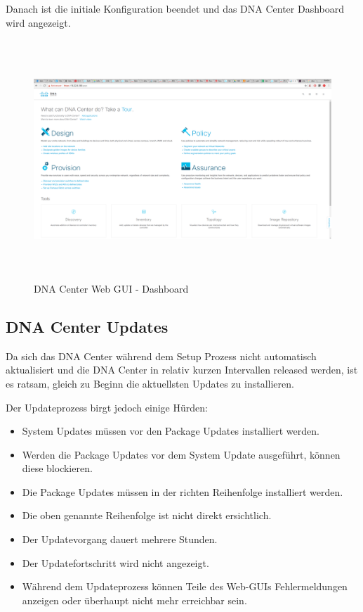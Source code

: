 Danach ist die initiale Konfiguration beendet und das DNA Center Dashboard wird angezeigt.

\begin{figure}[H]
	\centering
	\includegraphics[height=9cm]{img/sc_008.png}
	\caption{DNA Center Web GUI - Dashboard}
	\label{fig:dna-center-gui-4}
\end{figure}

\subsection{DNA Center Updates}
Da sich das DNA Center während dem Setup Prozess nicht automatisch aktualisiert und die DNA Center in relativ kurzen Intervallen released werden, ist es ratsam, gleich zu Beginn die aktuellsten Updates zu installieren.

Der Updateprozess birgt jedoch einige Hürden:
\begin{itemize}
	\item System Updates müssen vor den Package Updates installiert werden.
	\item Werden die Package Updates vor dem System Update ausgeführt, können diese blockieren. 
	\item Die Package Updates müssen in der richten Reihenfolge installiert werden.
	\item Die oben genannte Reihenfolge ist nicht direkt ersichtlich.
	\item Der Updatevorgang dauert mehrere Stunden.
	\item Der Updatefortschritt wird nicht angezeigt. 
	\item Während dem Updateprozess können Teile des Web-GUIs Fehlermeldungen anzeigen oder überhaupt nicht mehr erreichbar sein.\\
\end{itemize} 

